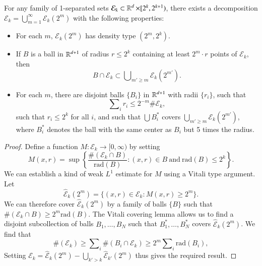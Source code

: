 %
%

\begin{lemma} \label{DecompositionTheorem}
    For any family of 1-separated sets $\mathcal{E}_k \subset \operatorname{\mathbb{R}}^d \times [2^k,2^{k+1})$, there exists a decomposition $\mathcal{E}_k = \bigcup_{m = 1}^\infty \mathcal{E}_k(2^m)$ with the following properties:
    \begin{itemize}[leftmargin=30pt]
        \item For each $m$, $\mathcal{E}_k(2^m)$ has density type $(2^m,2^k)$.

        \item If $B$ is a ball in $\operatorname{\mathbb{R}}^{d+1}$ of radius $r \leq 2^k$ containing at least $2^m \cdot r$ points of $\mathcal{E}_k$, then
        \[ B \cap \mathcal{E}_k \subset \bigcup\nolimits_{m' \geq m} \mathcal{E}_k(2^{m'}). \]

        \item For each $m$, there are disjoint balls $\{ B_i \}$ in $\operatorname{\mathbb{R}}^{d+1}$ with radii $\{ r_i \}$, such that
        \[ \sum\nolimits_i r_i \leq 2^{-m} \# \mathcal{E}_k, \]
        such that $r_i \leq 2^k$ for all $i$, and such that $\bigcup B_i^*$ covers $\bigcup_{m' \geq m} \mathcal{E}_k(2^{m'})$, where $B_i^*$ denotes the ball with the same center as $B_i$ but 5 times the radius.
    \end{itemize}
\end{lemma}
\begin{proof}
    Define a function $M: \mathcal{E}_k \to [0,\infty)$ by setting
    \begin{equation}
      M(x,r) = \sup \left\{ \frac{\#(\mathcal{E}_k \cap B)}{\text{rad}(B)} : (x,r) \in B\ \text{and}\ \text{rad}(B) \leq 2^k \right\}.
    \end{equation}
    We can establish a kind of weak $L^1$ estimate for $M$ using a Vitali type argument. Let
    \begin{equation}
      \widehat{\mathcal{E}}_k(2^m) = \{ (x,r) \in \mathcal{E}_k : M(x,r) \geq 2^m \}.
    \end{equation}
    We can therefore cover $\widehat{\mathcal{E}}_k(2^m)$ by a family of balls $\{ B \}$ such that $\#(\mathcal{E}_k \cap B) \geq 2^m \text{rad}(B)$. The Vitali covering lemma allows us to find a disjoint subcollection of balls $B_1,\dots,B_N$ such that $B_1^* ,\dots, B_N^*$ covers $\widehat{\mathcal{E}}_k(2^m)$. We find that
    \begin{equation}
      \#(\mathcal{E}_k) \geq \sum\nolimits_i \#(B_i \cap \mathcal{E}_k) \geq 2^m \sum\nolimits_i \text{rad}(B_i),
    \end{equation}
    Setting $\mathcal{E}_k = \widehat{\mathcal{E}}_k(2^m) - \bigcup_{k' > k} \widehat{\mathcal{E}}_{k'}(2^m)$ thus gives the required result.
\end{proof}

